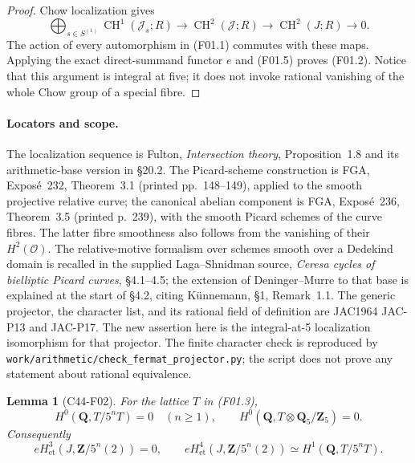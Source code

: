 \documentclass[11pt]{article}
\newtheorem{lemma}[theorem]{Lemma}
\theoremstyle{remark}\newtheorem{remark}[theorem]{Remark}
\begin{document}
\begin{proof}
Chow localization gives
\[
 \bigoplus_{s\in S^{(1)}}\operatorname{CH}^1(\mathcal J_s;R)
 \longrightarrow\operatorname{CH}^2(\mathcal J;R)
 \longrightarrow\operatorname{CH}^2(J;R)\longrightarrow0.
 \tag{F01.6}
\]
The action of every automorphism in (F01.1) commutes with these
maps.  Applying the exact direct-summand functor $e$ and (F01.5)
proves (F01.2).  Notice that this argument is integral at five;
it does not invoke rational vanishing of the whole Chow group of
a special fibre.
\end{proof}

\paragraph{Locators and scope.}
The localization sequence is Fulton, \emph{Intersection theory},
Proposition~1.8 and its arithmetic-base version in \S20.2.
The Picard-scheme construction is FGA, Expos\'e~232,
Theorem~3.1 (printed pp.~148--149), applied to the smooth
projective relative curve; the canonical abelian component is
FGA, Expos\'e~236, Theorem~3.5 (printed p.~239), with the smooth
Picard schemes of the curve fibres.  The latter fibre smoothness
also follows from the vanishing of their $H^2(\mathcal O)$.
The relative-motive formalism over schemes smooth over a Dedekind
domain is recalled in the supplied Laga--Shnidman source,
\emph{Ceresa cycles of bielliptic Picard curves}, \S4.1--4.5;
the extension of Deninger--Murre to that base is explained at the
start of \S4.2, citing K\"unnemann, \S1, Remark~1.1.
The generic projector, the character list, and its rational field
of definition are JAC1964 JAC-P13 and JAC-P17.  The new assertion
here is the integral-at-5 localization isomorphism for that
projector.  The finite character check is reproduced by
\texttt{work/arithmetic/check\_fermat\_projector.py}; the script
does not prove any statement about rational equivalence.

\begin{lemma}[C44-F02]\label{C44-F02}
For the lattice $T$ in (F01.3),
\[
 H^0(\mathbf Q,T/5^nT)=0\quad(n\ge1),
 \qquad H^0(\mathbf Q,T\otimes\mathbf Q_5/\mathbf Z_5)=0.
 \tag{F02.1}
\]
Consequently
\[
 eH^3_{\mathrm{et}}(J,\mathbf Z/5^n(2))=0,
 \qquad
 eH^4_{\mathrm{et}}(J,\mathbf Z/5^n(2))
       \simeq H^1(\mathbf Q,T/5^nT).             \tag{F02.2}
\]
\end{lemma}
\end{document}
